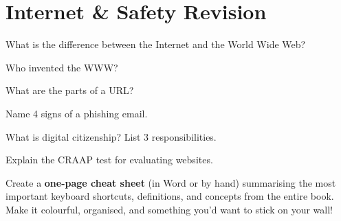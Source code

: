 \section{Internet \& Safety Revision}
\label{sec:internet-revision}

\begin{reviewqs}
  \item What is the difference between the Internet and the World Wide Web?
  \item Who invented the WWW?
  \item What are the parts of a URL?
  \item Name 4 signs of a phishing email.
  \item What is digital citizenship? List 3 responsibilities.
  \item Explain the CRAAP test for evaluating websites.
\end{reviewqs}

\begin{challenge}
Create a \textbf{one-page cheat sheet} (in Word or by hand) summarising the most important keyboard shortcuts, definitions, and concepts from the entire book. Make it colourful, organised, and something you'd want to stick on your wall!
\end{challenge}
